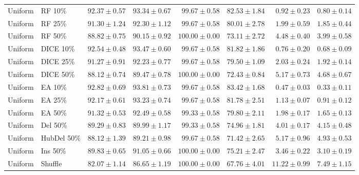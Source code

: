 {\begin{longtable}{llrrrrrr}
Uniform & RF 10\% & $92.37\pm0.57$ & $93.34\pm0.67$ & $99.67\pm0.58$ & $82.53\pm1.84$ & $0.92\pm0.23$ & $0.80\pm0.14$ \\
Uniform & RF 25\% & $91.30\pm1.24$ & $92.30\pm1.12$ & $99.67\pm0.58$ & $80.01\pm2.78$ & $1.99\pm0.59$ & $1.85\pm0.44$ \\
Uniform & RF 50\% & $88.82\pm0.75$ & $90.15\pm0.92$ & $100.00\pm0.00$ & $73.11\pm2.72$ & $4.48\pm0.40$ & $3.99\pm0.58$ \\
Uniform & DICE 10\% & $92.54\pm0.48$ & $93.47\pm0.60$ & $99.67\pm0.58$ & $81.82\pm1.86$ & $0.76\pm0.20$ & $0.68\pm0.09$ \\
Uniform & DICE 25\% & $91.27\pm0.91$ & $92.23\pm0.77$ & $99.67\pm0.58$ & $79.50\pm1.09$ & $2.03\pm0.24$ & $1.92\pm0.14$ \\
Uniform & DICE 50\% & $88.12\pm0.74$ & $89.47\pm0.78$ & $100.00\pm0.00$ & $72.43\pm0.84$ & $5.17\pm0.73$ & $4.68\pm0.67$ \\
Uniform & EA 10\% & $92.82\pm0.69$ & $93.81\pm0.73$ & $99.67\pm0.58$ & $83.42\pm1.68$ & $0.47\pm0.03$ & $0.33\pm0.11$ \\
Uniform & EA 25\% & $92.17\pm0.61$ & $93.23\pm0.74$ & $99.67\pm0.58$ & $81.78\pm2.51$ & $1.13\pm0.07$ & $0.91\pm0.12$ \\
Uniform & EA 50\% & $91.32\pm0.53$ & $92.49\pm0.58$ & $99.33\pm0.58$ & $79.80\pm2.11$ & $1.98\pm0.17$ & $1.65\pm0.13$ \\
Uniform & Del 50\% & $89.29\pm0.83$ & $89.99\pm1.17$ & $99.33\pm0.58$ & $74.96\pm1.81$ & $4.01\pm0.17$ & $4.15\pm0.48$ \\
Uniform & HubDel 50\% & $88.12\pm1.39$ & $89.21\pm0.98$ & $99.67\pm0.58$ & $71.42\pm2.65$ & $5.17\pm0.96$ & $4.93\pm0.53$ \\
Uniform & Ins 50\% & $89.83\pm0.65$ & $91.05\pm0.66$ & $100.00\pm0.00$ & $75.21\pm2.47$ & $3.46\pm0.22$ & $3.10\pm0.19$ \\
Uniform & Shuffle & $82.07\pm1.14$ & $86.65\pm1.19$ & $100.00\pm0.00$ & $67.76\pm4.01$ & $11.22\pm0.99$ & $7.49\pm1.15$ \\
\end{longtable}
}

